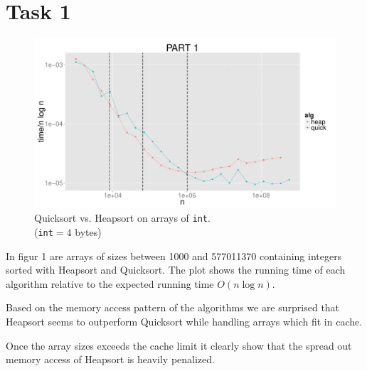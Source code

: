 \documentclass{article}
\begin{document}
\section*{Task 1}
\begin{figure}[H]
    \centering
    \includegraphics[width=
    \textwidth]{images/part1.pdf}
    \caption{Quicksort vs. Heapsort on arrays of \texttt{int}. 
    \\(\texttt{int}$= 4$ bytes)}
\end{figure}
In figur 1 are arrays of sizes between 1000 and 577011370 containing integers 
sorted with Heapsort and Quicksort. The plot shows the running time of each 
algorithm relative to the expected running time $O(n \log n)$. 

Based on the memory access pattern of the algorithms we are surprised that 
Heapsort seems to outperform Quicksort while handling arrays which fit in cache.

Once the array sizes exceeds the cache limit it clearly show that the spread out
memory access of Heapsort is heavily penalized.
\end{document}
